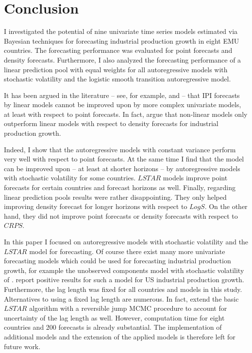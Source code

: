 \documentclass[12pt,letterpaper,fleqn]{article}           %
\begin{document}

\section{Conclusion}
\label{sec:conclusion}

I investigated the potential of nine univariate time series models estimated via Bayesian techniques for forecasting industrial production growth in eight EMU countries. The forecasting performance was evaluated for point forecasts and density forecasts. Furthermore, I also analyzed the forecasting performance of a linear prediction pool with equal weights for all autoregressive models with stochastic volatility and the logistic smooth transition autoregressive model. 

It has been argued in the literature -- see, for example, \textcite{marc02} and \textcite{dijk03} -- that IPI forecasts by linear models cannot be improved upon by more complex univariate models, at least with respect to point forecasts. In fact, \textcite{dijk03} argue that non-linear models only outperform linear models with respect to density forecasts for industrial production growth.

Indeed, I show that the autoregressive models with constant variance perform very well with respect to point forecasts. At the same time I find that the model can be improved upon -- at least at shorter horizons -- by autoregressive models with stochastic volatility for some countries. $LSTAR$ models improve point forecasts for certain countries and forecast horizons as well. Finally, regarding linear prediction pools results were rather disappointing. They only helped improving density forecast for longer horizons with respect to $LogS$. On the other hand, they did not improve point forecasts or density forecasts with respect to $CRPS$.

In this paper I focused on autoregressive models with stochastic volatility and the $LSTAR$ model for forecasting. Of course there exist many more univariate forecasting models which could be used for forecasting industrial production growth, for example the unobserved components model with stochastic volatility of \textcite{stock07}. \textcite{bos10} report positive results for such a model for US industrial production growth. Furthermore, the lag length was fixed for all countries and models in this study. Alternatives to using a fixed lag length are numerous. In fact, \textcite{lopes06} extend the basic $LSTAR$ algorithm with a reversible jump MCMC procedure to account for uncertainty of the lag length as well. However, computation time for eight countries and 200 forecasts is already substantial. The implementation of additional models and the extension of the applied models is therefore left for future work.
 
\end{document}
